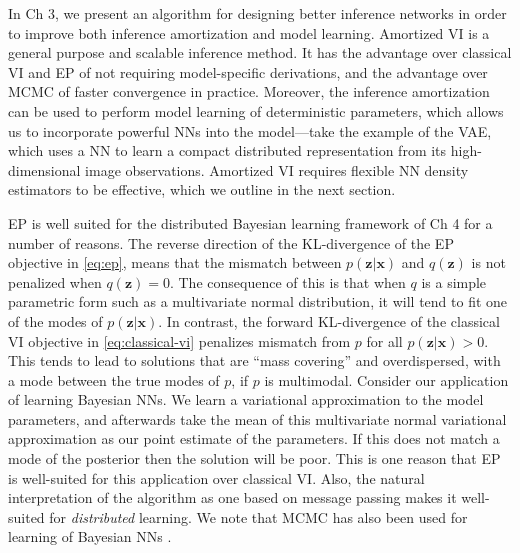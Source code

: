 In Ch 3, we present an algorithm for designing better inference networks in order to improve both inference amortization and model learning. Amortized VI is a general purpose and scalable inference method. It has the advantage over classical VI and EP of not requiring model-specific derivations, and the advantage over MCMC of faster convergence in practice. Moreover, the inference amortization can be used to perform model learning of deterministic parameters, which allows us to incorporate powerful NNs into the model---take the example of the VAE, which uses a NN to learn a compact distributed representation from its high-dimensional image observations. Amortized VI requires flexible NN density estimators to be effective, which we outline in the next section.

EP is well suited for the distributed Bayesian learning framework of Ch 4 for a number of reasons. The reverse direction of the KL-divergence of the EP objective in \eqref{eq:ep}, means that the mismatch between $p(\mathbf{z}|\mathbf{x})$ and $q(\mathbf{z})$ is not penalized when $q(\mathbf{z})=0$. The consequence of this is that when $q$ is a simple parametric form such as a multivariate normal distribution, it will tend to fit one of the modes of $p(\mathbf{z}|\mathbf{x})$. In contrast, the forward KL-divergence of the classical VI objective in \eqref{eq:classical-vi} penalizes mismatch from $p$ for all $p(\mathbf{z}|\mathbf{x})>0$. This tends to lead to solutions that are ``mass covering'' and overdispersed, with a mode between the true modes of $p$, if $p$ is multimodal. Consider our application of learning Bayesian NNs. We learn a variational approximation to the model parameters, and afterwards take the mean of this multivariate normal variational approximation as our point estimate of the parameters. If this does not match a mode of the posterior then the solution will be poor. This is one reason that EP is well-suited for this application over classical VI. Also, the natural interpretation of the algorithm as one based on message passing makes it well-suited for \emph{distributed} learning. We note that MCMC has also been used for learning of Bayesian NNs \citep{Neal2012}.

